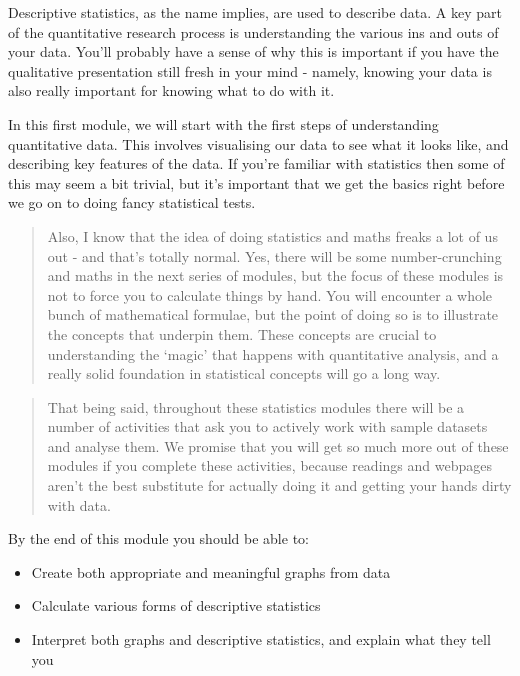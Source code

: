 \documentclass[
]{book}
\providecommand{\tightlist}{%
  \setlength{\itemsep}{0pt}\setlength{\parskip}{0pt}}
\begin{document}
Descriptive statistics, as the name implies, are used to describe data. A key part of the quantitative research process is understanding the various ins and outs of your data. You'll probably have a sense of why this is important if you have the qualitative presentation still fresh in your mind - namely, knowing your data is also really important for knowing what to do with it.

In this first module, we will start with the first steps of understanding quantitative data. This involves visualising our data to see what it looks like, and describing key features of the data. If you're familiar with statistics then some of this may seem a bit trivial, but it's important that we get the basics right before we go on to doing fancy statistical tests.

\begin{quote}
Also, I know that the idea of doing statistics and maths freaks a lot of us out - and that's totally normal. Yes, there will be some number-crunching and maths in the next series of modules, but the focus of these modules is not to force you to calculate things by hand. You will encounter a whole bunch of mathematical formulae, but the point of doing so is to illustrate the concepts that underpin them. These concepts are crucial to understanding the `magic' that happens with quantitative analysis, and a really solid foundation in statistical concepts will go a long way.
\end{quote}

\begin{quote}
That being said, throughout these statistics modules there will be a number of activities that ask you to actively work with sample datasets and analyse them. We promise that you will get so much more out of these modules if you complete these activities, because readings and webpages aren't the best substitute for actually doing it and getting your hands dirty with data.
\end{quote}

By the end of this module you should be able to:

\begin{itemize}
\tightlist
\item
  Create both appropriate and meaningful graphs from data
\item
  Calculate various forms of descriptive statistics
\item
  Interpret both graphs and descriptive statistics, and explain what they tell you
\end{itemize}
\end{document}
